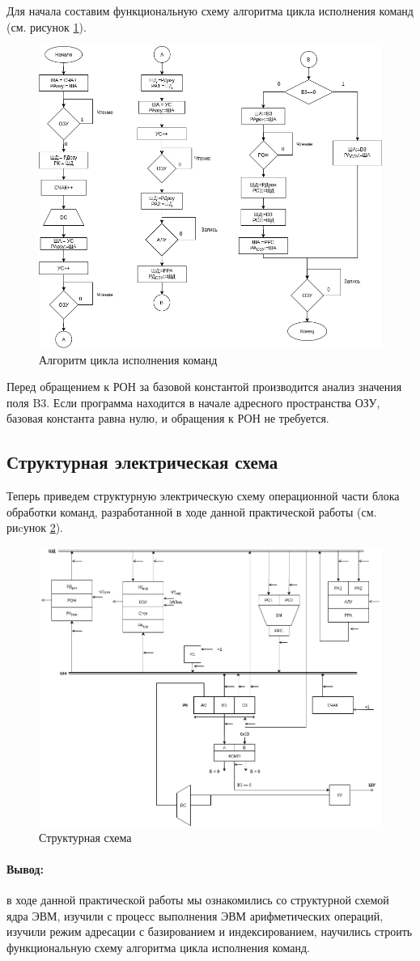 \documentclass[a4paper,14pt]{extarticle}
\begin{document}
	Для начала составим функциональную схему алгоритма цикла исполнения команд (см. рисунок \ref{fig:func-alg}).
	
	
	\begin{figure}[htbp]
		\centering
		\includegraphics[width=0.8\linewidth]{images/func-alg3-2}
		\caption{Алгоритм цикла исполнения команд}
		\label{fig:func-alg}
	\end{figure}

Перед обращением к РОН за базовой константой производится анализ значения поля B3. Если программа находится в начале адресного пространства ОЗУ, базовая константа равна нулю, и обращения к РОН не
требуется.

	
	\subsection*{Структурная электрическая схема}
	Теперь приведем структурную электрическую схему операционной части блока обработки команд, разработанной в ходе данной практической работы (см. риcунок \ref{fig:unit}).
	\begin{figure}[h!]
		\centering
		\includegraphics[width=0.7\linewidth]{images/unit-3}
		\caption{Структурная схема}
		\label{fig:unit}
	\end{figure}

	\paragraph{Вывод:}
	в ходе данной практической работы мы ознакомились со структурной схемой ядра ЭВМ, изучили с процесс выполнения ЭВМ арифметических операций, изучили режим адресации с базированием и индексированием, научились строить функциональную схему алгоритма цикла исполнения команд. 
	
	
\end{document}
